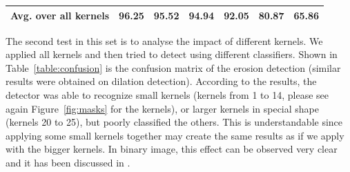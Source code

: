 \documentclass[review]{elsarticle}
\begin{document}
\begin{table}[!t]
\begin{tabular}{c|cccccc}
			\hline
			\textbf{Avg. over all kernels}&96.25&95.52&94.94&92.05&80.87&65.86\\
			\hline\hline	
	\end{tabular}
\end{table}

The second test in this set is to analyse the impact of different kernels. We applied all kernels and then tried to detect using different classifiers. Shown in Table~\ref{table:confusion} is the confusion matrix of the erosion detection (similar results were obtained on dilation detection). According to the results, the detector was able to recognize small kernels (kernels from 1 to 14, please see again Figure~\ref{fig:masks} for the kernels), or larger kernels in special shape (kernels 20 to 25), but poorly classified the others. This is understandable since applying some small kernels together may create the same results as if we apply with the bigger kernels. In binary image, this effect can be observed very clear and it has been discussed in \cite{DeNatale2016}.
\end{document}

